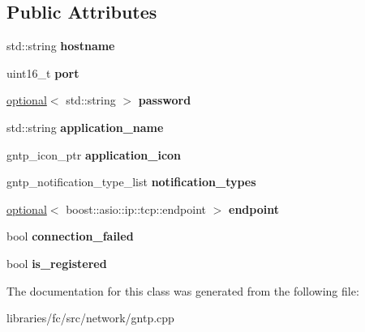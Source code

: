 \subsection*{Public Attributes}
\begin{DoxyCompactItemize}
\item 
\mbox{\label{classfc_1_1detail_1_1gntp__notifier__impl_a254914fafc612bd8b1a0b9ab23a6d20f}} 
std\+::string {\bfseries hostname}
\item 
\mbox{\label{classfc_1_1detail_1_1gntp__notifier__impl_ac862ea3578144e0ec8c26cb12b769113}} 
uint16\+\_\+t {\bfseries port}
\item 
\mbox{\label{classfc_1_1detail_1_1gntp__notifier__impl_a1e28f05548af14ec22f34c7b971f6938}} 
\mbox{\hyperlink{classfc_1_1optional}{optional}}$<$ std\+::string $>$ {\bfseries password}
\item 
\mbox{\label{classfc_1_1detail_1_1gntp__notifier__impl_afa33620f1d1ab42dcf66dc1d21e24a92}} 
std\+::string {\bfseries application\+\_\+name}
\item 
\mbox{\label{classfc_1_1detail_1_1gntp__notifier__impl_afa555aae5646b6a5bbb9a9574727f384}} 
gntp\+\_\+icon\+\_\+ptr {\bfseries application\+\_\+icon}
\item 
\mbox{\label{classfc_1_1detail_1_1gntp__notifier__impl_ac9bda0980c694aef50bab27666fb9a2e}} 
gntp\+\_\+notification\+\_\+type\+\_\+list {\bfseries notification\+\_\+types}
\item 
\mbox{\label{classfc_1_1detail_1_1gntp__notifier__impl_a68521464691e2b0bcc70a9dd21d792e3}} 
\mbox{\hyperlink{classfc_1_1optional}{optional}}$<$ boost\+::asio\+::ip\+::tcp\+::endpoint $>$ {\bfseries endpoint}
\item 
\mbox{\label{classfc_1_1detail_1_1gntp__notifier__impl_a162d9c0c8dfae3cbd296ca23f32616c7}} 
bool {\bfseries connection\+\_\+failed}
\item 
\mbox{\label{classfc_1_1detail_1_1gntp__notifier__impl_a7d8edce34878938665c010ee8a42fa2b}} 
bool {\bfseries is\+\_\+registered}
\end{DoxyCompactItemize}


The documentation for this class was generated from the following file\+:\begin{DoxyCompactItemize}
\item 
libraries/fc/src/network/gntp.\+cpp\end{DoxyCompactItemize}
